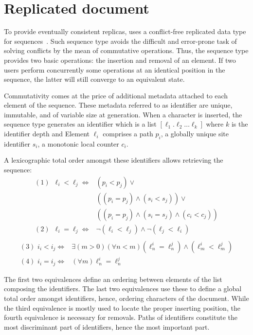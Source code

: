 
\section{Replicated document}
\label{sec:structure}

To provide eventually consistent replicas, \CRATE uses a conflict-free
replicated data type for sequences~\cite{shapiro2011comprehensive}. Such
sequence type avoids the difficult and error-prone task of solving conflicts by
the mean of commutative operations. Thus, the sequence type provides two basic
operations: the insertion and removal of an element. If two users perform
concurrently some operations at an identical position in the sequence, the
latter will still converge to an equivalent state.

Commutativity comes at the price of additional metadata attached to each
element of the sequence. These metadata referred to as identifier are unique,
immutable, and of variable size at generation. When a character is inserted, the
sequence type generates an identifier which is a list
$[\ell_1.\ell_2\ldots \ell_k]$ where $k$ is the identifier depth and Element
$\ell_i$ comprises a path $p_i$, a globally unique site identifier $s_i$, a
monotonic local counter $c_i$.

A lexicographic total order amongst these identifiers allows retrieving the
sequence:
\begin{align*}
(1)\,\,\,  \ell_i < \ell_j \iff & (p_i < p_j) \vee \\
                       & ((p_i = p_j) \wedge (s_i<s_j)) \vee \\
                       & ((p_i = p_j) \wedge (s_i = s_j) \wedge (c_i < c_j)) \\
(2)\,\,\,  \ell_i = \ell_j \iff & \neg (\ell_i < \ell_j) \wedge \neg (\ell_j < \ell_i) \\
\end{align*}
\begin{align*}
(3)\,\,  i_i < i_j \iff & \exists (m > 0)(\forall n < m) (\ell^i_n = \ell^j_n) \wedge (\ell^i_m < \ell^j_m) \\
(4)\,\,  i_i = i_j \iff & (\forall m) \ell^i_n = \ell^j_n
\end{align*}

The first two equivalences define an ordering between elements of the list
composing the identifiers. The last two equivalences use these to define a
global total order amongst identifiers, hence, ordering characters of the
document. While the third equivalence is mostly used to locate the proper
inserting position, the fourth equivalence is necessary for removals.  Paths of
identifiers constitute the most discriminant part of identifiers, hence the most
important part.

